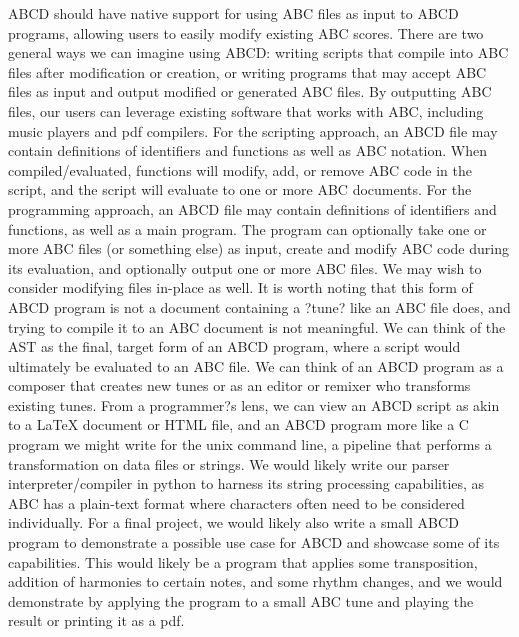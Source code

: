 	ABCD should have native support for using ABC files as input to ABCD programs, allowing users to easily modify existing ABC scores. There are two general ways we can imagine using ABCD: writing scripts that compile into ABC files after modification or creation, or writing programs that may accept ABC files as input and output modified or generated ABC files. By outputting ABC files, our users can leverage existing software that works with ABC, including music players and pdf compilers.
	For the scripting approach, an ABCD file may contain definitions of identifiers and functions as well as ABC notation. When compiled/evaluated, functions will modify, add, or remove ABC code in the script, and the script will evaluate to one or more ABC documents.
	For the programming approach, an ABCD file may contain definitions of identifiers and functions, as well as a main program. The program can optionally take one or more ABC files (or something else) as input, create and modify ABC code during its evaluation, and optionally output one or more ABC files. We may wish to consider modifying files in-place as well. It is worth noting that this form of ABCD program is not a document containing a ?tune? like an ABC file does, and trying to compile it to an ABC document is not meaningful. We can think of the AST as the final, target form of an ABCD program, where a script would ultimately be evaluated to an ABC file. We can think of an ABCD program as a composer that creates new tunes or as an editor or remixer who transforms existing tunes. From a programmer?s lens, we can view an ABCD script as akin to a LaTeX document or HTML file, and an ABCD program more like a C program we might write for the unix command line, a pipeline that performs a transformation on data files or strings.
	We would likely write our parser interpreter/compiler in python to harness its string processing capabilities, as ABC has a plain-text format where characters often need to be considered individually.
	For a final project, we would likely also write a small ABCD program to demonstrate a possible use case for ABCD and showcase some of its capabilities. This would likely be a program that applies some transposition, addition of harmonies to certain notes, and some rhythm changes, and we would demonstrate by applying the program to a small ABC tune and playing the result or printing it as a pdf.
